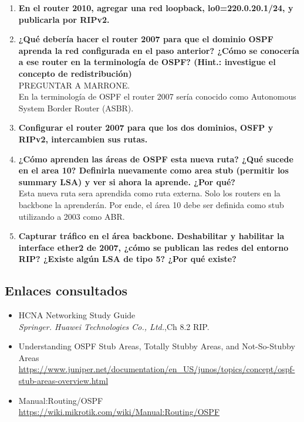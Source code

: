 \documentclass[letterpaper,12pt]{article}
\begin{document}
\begin{enumerate}
		\item \textbf{En el router 2010, agregar una red loopback, lo0=220.0.20.1/24, y publicarla por RIPv2.}
		
		\item \textbf{¿Qué debería hacer el router 2007 para que el dominio OSPF aprenda la red configurada en el paso anterior? ¿Cómo se conocería a ese router en la terminología de OSPF? (Hint.: investigue el concepto de redistribución)}\\
		PREGUNTAR A MARRONE.\\
		En la terminología de OSPF el router 2007 sería conocido como Autonomous System Border Router (ASBR).
		
		\item \textbf{Configurar el router 2007 para que los dos dominios, OSFP y RIPv2, intercambien sus rutas.}
		
		\item \textbf{¿Cómo aprenden las áreas de OSPF esta nueva ruta? ¿Qué sucede en el area 10? Definirla nuevamente como area stub (permitir los summary LSA) y ver si ahora la aprende. ¿Por qué?}\\
		Esta nueva ruta sera aprendida como ruta externa. Solo los routers en la backbone la aprenderán. Por ende, el área 10 debe ser definida como stub utilizando a 2003 como ABR.   
		
		\item \textbf{Capturar tráfico en el área backbone. Deshabilitar y habilitar la interface ether2 de 2007, ¿cómo se publican las redes del entorno RIP? ¿Existe algún LSA de tipo 5? ¿Por qué existe?}\\
		

	\end{enumerate}

	\subsection{Enlaces consultados}
		\begin{itemize}
			\item{HCNA Networking Study Guide}  \\
			\textit{Springer. Huawei Technologies Co., Ltd.},Ch 8.2 RIP.
			\item{Understanding OSPF Stub Areas, Totally Stubby Areas, and Not-So-Stubby Areas}  \\
			\url{https://www.juniper.net/documentation/en_US/junos/topics/concept/ospf-stub-areas-overview.html}
			\item{Manual:Routing/OSPF}  \\
			\url{https://wiki.mikrotik.com/wiki/Manual:Routing/OSPF}
		\end{itemize}
\end{document}
